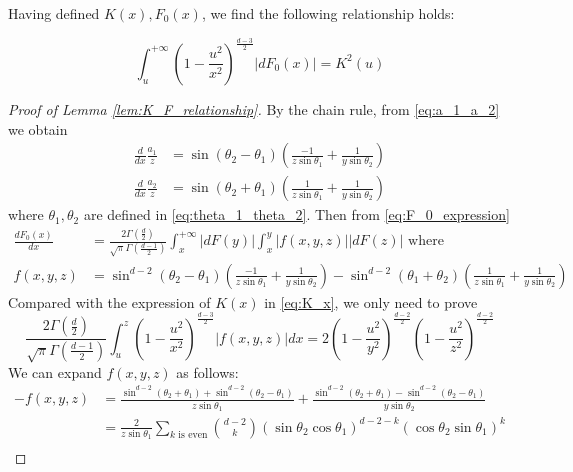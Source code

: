 \documentclass{aptpub}
\begin{document}
Having defined $K(x), F_0(x)$, we find the following relationship holds:
\begin{lemma}\label{lem:K_F_relationship}
\begin{equation}\label{eq:F_0_integration}
     \int_u^{+\infty}
     (1-\frac{u^2}{x^2})^{\frac{d-3}{2}} |dF_0(x)| = K^2(u)
\end{equation}
\end{lemma}
\begin{proof}[Proof of Lemma \ref{lem:K_F_relationship}]
     By the chain rule, from \eqref{eq:a_1_a_2} we obtain
\begin{align*}
    \frac{d}{dx}\frac{a_1}{z} &
    = \sin(\theta_2 - \theta_1)
    \left(\frac{-1}{z\sin\theta_1}
    +\frac{1}{y\sin \theta_2}\right)\\
    \frac{d}{dx}\frac{a_2}{z} &
    = \sin(\theta_2 + \theta_1)
    \left(\frac{1}{z\sin\theta_1}
    +\frac{1}{y\sin \theta_2}\right)
\end{align*}
where $\theta_1, \theta_2$ are defined in \eqref{eq:theta_1_theta_2}.
Then from \eqref{eq:F_0_expression}
\begin{align*}
    \frac{d F_0(x)}{dx} & =\frac{2\Gamma(\frac{d}{2})}
    {\sqrt{\pi}\Gamma(\frac{d-1}{2})}
    \int_x^{+\infty} |dF(y)| \int_x^y |f(x,y,z)| |dF(z)| 
    \textrm{ where }\\
    f(x,y,z) & = \sin^{d-2} (\theta_2 - \theta_1)
    \left(\frac{-1}{z\sin\theta_1}
    +\frac{1}{y\sin \theta_2}\right)
    - \sin^{d-2}(\theta_1 + \theta_2)
    \left(\frac{1}{z\sin\theta_1}
    +\frac{1}{y\sin \theta_2}\right)
\end{align*}
Compared with the expression of $K(x)$ in
\eqref{eq:K_x},
we only need to prove
\begin{equation}\label{eq:ref_prove_integration}    
    \frac{2\Gamma(\frac{d}{2})}
    {\sqrt{\pi}\Gamma(\frac{d-1}{2})}
    \int_u^z (1-\frac{u^2}{x^2})^{\frac{d-3}{2}}
    |f(x,y,z)|dx =
    2(1-\frac{u^2}{y^2})^{\frac{d-2}{2}}
    (1-\frac{u^2}{z^2})^{\frac{d-2}{2}}
\end{equation}
We can expand $f(x,y,z)$ as follows:
\begin{align*}
-f(x,y,z)&=\frac{\sin^{d-2}(\theta_2+\theta_1)
+ \sin^{d-2}(\theta_2 - \theta_1)}{z\sin\theta_1}
+\frac{\sin^{d-2}(\theta_2+\theta_1)
- \sin^{d-2}(\theta_2 - \theta_1)}{y\sin\theta_2} \\
&=\frac{2}{z\sin\theta_1}\sum_{k \textrm{ is even}}
\binom{d-2}{k} (\sin\theta_2\cos\theta_1)^{d-2-k}
(\cos\theta_2 \sin\theta_1)^k \\

\end{align*}
\end{proof}
\end{document}
